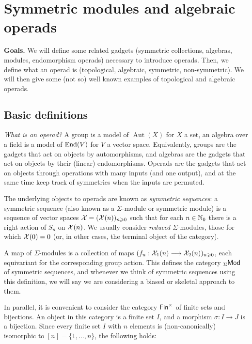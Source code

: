 \section{Symmetric modules and algebraic operads}\label{lecture:thebasics}

\textbf{Goals.}
We will define
some related gadgets (symmetric collections,
algebras, modules, endomorphism operads)
necessary to introduce operads. 
Then, we define what an operad is (topological,
algebraic, symmetric, non-symmetric). 
We will then give some
(not so) well known examples of topological
and algebraic operads.

\subsection{Basic definitions}
\emph{What is an operad?} A group is a model of
$\operatorname{Aut}(X)$ for $X$ a set, an algebra
over a field
is a model of $\operatorname{End}(V)$ for $V$
a vector space. Equivalently, groups are the
gadgets that act on objects by automorphisms,
and algebras are the gadgets that act
on objects by their (linear) endomorphisms. 
Operads are the gadgets that act on
objects through operations with many 
inputs (and one output), and at the same
time keep track of symmetries when
the inputs are permuted.

The underlying objects to operads are known as
\emph{symmetric sequences}: a symmetric sequence
(also known as a $\Sigma$-module or symmetric 
module) is a sequence of vector spaces
$\mathcal{X} = (\mathcal{X}(n))_{n\geqslant 0}$ such that for
each $n\in\mathbb N_0$ there is a right action of
$S_n$ on $\mathcal{X}(n)$. We usually consider \emph{reduced}
$\Sigma$-modules, those for which $\mathcal{X}(0)=0$
(or, in other cases, the terminal object of the
category).

A map of $\Sigma$-modules is a collection of maps
$(f_n : \mathcal{X}_1(n) \longrightarrow \mathcal{X}_2(n))_{n\geqslant 0}$,
each equivariant for the corresponding group action. 
This defines the category ${}_\Sigma\mathsf{Mod}$ of symmetric
sequences, and whenever we think of symmetric sequences
using this definition, we will say we are considering  
a biased or skeletal approach to them.

In parallel, it is convenient to consider the 
category $\mathsf{Fin}^\times$ of finite sets and bijections.
An object in this category is a finite set $I$,
and a morphism $\sigma : I\longrightarrow J$ is a
bijection. Since every finite set $I$ with $n$
elements is (non-canonically) isomorphic to 
$[n] =\{1,\ldots,n\}$, the following holds:

